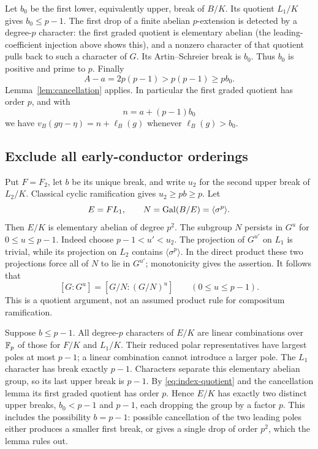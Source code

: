 Let \(b_0\) be the first lower, equivalently upper, break
of \(B/K\). Its quotient \(L_1/K\) gives \(b_0\le p-1\).
The first drop of a finite abelian \(p\)-extension is detected
by a degree-\(p\) character: the first graded quotient is
elementary abelian (the leading-coefficient injection above
shows this), and a nonzero character of that quotient pulls
back to such a character of \(G\). Its Artin--Schreier break
is \(b_0\). Thus \(b_0\) is positive and prime to \(p\).
Finally
\[
 A-a=2p(p-1)>p(p-1)\ge p b_0.
\]
Lemma~\ref{lem:cancellation} applies. In particular the first
graded quotient has order \(p\), and with
\begin{equation}\label{eq:n-compositum}
 n=a+(p-1)b_0
\end{equation}
we have \(v_B(g\eta-\eta)=n+\ell_B(g)\) whenever
\(\ell_B(g)>b_0\).

\subsection{Exclude all early-conductor orderings}

Put \(F=F_2\), let \(b\) be its unique break, and write
\(u_2\) for the second upper break of \(L_2/K\).
Classical cyclic ramification gives \(u_2\ge pb\ge p\).
Let
\[
 E=FL_1,\qquad N=\operatorname{Gal}(B/E)=\langle\sigma^p\rangle .
\]
Then \(E/K\) is elementary abelian of degree \(p^2\).
The subgroup \(N\) persists in \(G^u\) for \(0\le u\le p-1\).
Indeed choose \(p-1<u'<u_2\).
The projection of \(G^{u'}\) on \(L_1\) is trivial, while its
projection on \(L_2\) contains \(\langle\sigma^p\rangle\).
In the direct product these two projections force all of
\(N\) to lie in \(G^{u'}\); monotonicity gives the assertion.
It follows that
\begin{equation}\label{eq:index-quotient}
 [G:G^u]=[G/N:(G/N)^u]\qquad(0\le u\le p-1).
\end{equation}
This is a quotient argument, not an assumed product rule for
compositum ramification.

Suppose \(b\le p-1\).
All degree-\(p\) characters of \(E/K\) are linear combinations
over \(\mathbb F_p\) of those for \(F/K\) and \(L_1/K\).
Their reduced polar representatives have largest poles at
most \(p-1\); a linear combination cannot introduce a larger
pole. The \(L_1\) character has break exactly \(p-1\).
Characters separate this elementary abelian group, so its
last upper break is \(p-1\).
By \eqref{eq:index-quotient} and the cancellation lemma its
first graded quotient has order \(p\). Hence \(E/K\) has
exactly two distinct upper breaks, \(b_0<p-1\) and \(p-1\),
each dropping the group by a factor \(p\).
This includes the possibility \(b=p-1\): possible
cancellation of the two leading poles either produces a
smaller first break, or gives a single drop of order \(p^2\),
which the lemma rules out.

